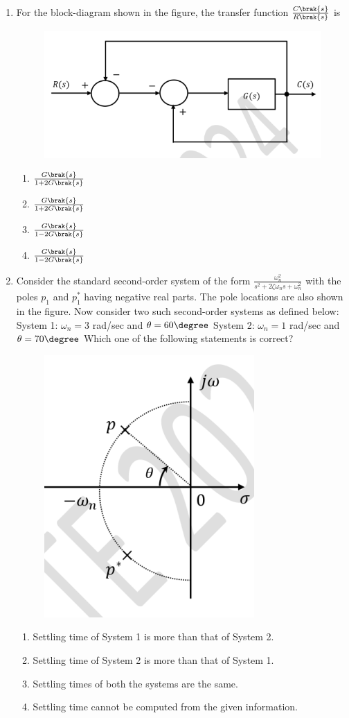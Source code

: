 \documentclass[journal,12pt,onecolumn]{IEEEtran}
\theoremstyle{remark}
\begin{document}
\begin{enumerate}[start=1, label=Q.\arabic*]
    \item For the block-diagram shown in the figure, the transfer function $\frac{C\brak{s}}{R\brak{s}}$ is
    \begin{figure}[H]
        \centering
        \includegraphics[width=0.5\columnwidth]{Figures/q20.png}
        \caption{}
    \end{figure}
    \begin{enumerate}
        \item $\frac{G\brak{s}}{1+2G\brak{s}}$
        \item $\frac{G\brak{s}}{1+2G\brak{s}}$
        \item $\frac{G\brak{s}}{1-2G\brak{s}}$
        \item $\frac{G\brak{s}}{1-2G\brak{s}}$
    \end{enumerate}

    \hfill{}

    \item Consider the standard second-order system of the form $\frac{\omega_n^2}{s^2+2\zeta\omega_n s+\omega_n^2}$ with the poles $p_1$ and $p_1^*$ having negative real parts. The pole locations are also shown in the figure. Now consider two such second-order systems as defined below:
    System 1: $\omega_n = 3$ rad/sec and $\theta = 60\degree$
    System 2: $\omega_n = 1$ rad/sec and $\theta = 70\degree$
    Which one of the following statements is correct?
    \begin{figure}[H]
        \centering
        \includegraphics[width=0.4\columnwidth]{Figures/q21.png}
        \caption{}
    \end{figure}
    \begin{enumerate}
        \item Settling time of System 1 is more than that of System 2.
        \item Settling time of System 2 is more than that of System 1.
        \item Settling times of both the systems are the same.
        \item Settling time cannot be computed from the given information.
    \end{enumerate}


\end{enumerate}
\end{document}
